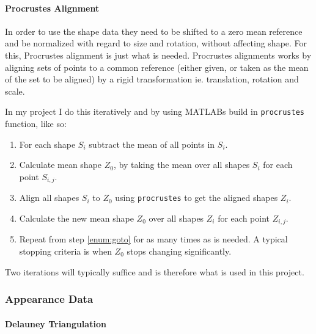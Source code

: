 \documentclass[Main]{subfiles}
\begin{document}
			\paragraph{Procrustes Alignment} %
				\label{par:procrustes_alignment}
				In order to use the shape data they need to be shifted to a zero mean reference and be normalized with regard to size and rotation, without affecting shape.
				For this, Procrustes alignment is just what is needed.
				Procrustes alignments works by aligning sets of points to a common reference (either given, or taken as the mean of the set to be aligned) by a rigid transformation ie. translation, rotation and scale.

				In my project I do this iteratively and by using MATLABs build in \texttt{procrustes} function, like so:
				\begin{enumerate}

					\item
					For each shape $S_i$ subtract the mean of all points in $S_i$.

					\item
					Calculate mean shape $Z_0$, by taking the mean over all shapes $S_i$ for each point $S_{i,j}$.

					\item
					\label{enum:goto}
					Align all shapes $S_i$ to $Z_0$ using \texttt{procrustes} to get the aligned shapes $Z_i$.

					\item
					Calculate the new mean shape $Z_0$ over all shapes $Z_i$ for each point $Z_{i,j}$.

					\item
					Repeat from step \ref{enum:goto} for as many times as is needed. 
					A typical stopping criteria is when $Z_0$ stops changing significantly.

				\end{enumerate}
				Two iterations will typically suffice and is therefore what is used in this project.




		\subsubsection{Appearance Data} %
			\label{ssub:appearance_data}
			

			\paragraph{Delauney Triangulation} %
				\label{par:delauney_triangulation}
				
\end{document}
